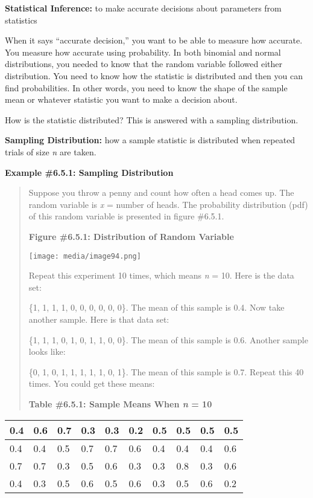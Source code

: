 \documentclass[]{book}
\begin{document}
\textbf{Statistical Inference:} to make accurate decisions about parameters from statistics

When it says ``accurate decision,'' you want to be able to measure how accurate. You measure how accurate using probability. In both binomial and normal distributions, you needed to know that the random variable followed either distribution. You need to know how the statistic is distributed and then you can find probabilities. In other words, you need to know the shape of the sample mean or whatever statistic you want to make a decision about.

How is the statistic distributed? This is answered with a sampling distribution.

\textbf{Sampling Distribution:} how a sample statistic is distributed when repeated trials of size \emph{n} are taken.

\textbf{Example \#6.5.1: Sampling Distribution}

\begin{quote}
Suppose you throw a penny and count how often a head comes up. The random variable is \emph{x} = number of heads. The probability distribution (pdf) of this random variable is presented in figure \#6.5.1.

\textbf{Figure \#6.5.1: Distribution of Random Variable}

\texttt{[image: media/image94.png]}

Repeat this experiment 10 times, which means \emph{n} = 10. Here is the data set:

\{1, 1, 1, 1, 0, 0, 0, 0, 0, 0\}. The mean of this sample is 0.4. Now take another sample. Here is that data set:

\{1, 1, 1, 0, 1, 0, 1, 1, 0, 0\}. The mean of this sample is 0.6.
Another sample looks like:

\{0, 1, 0, 1, 1, 1, 1, 1, 0, 1\}. The mean of this sample is 0.7. Repeat this 40 times. You could get these means:

\textbf{Table \#6.5.1: Sample Means When \emph{n} = 10}
\end{quote}

\begin{longtable}[]{@{}llllllllll@{}}
\toprule
0.4 & 0.6 & 0.7 & 0.3 & 0.3 & 0.2 & 0.5 & 0.5 & 0.5 & 0.5\tabularnewline
\midrule
\endhead
0.4 & 0.4 & 0.5 & 0.7 & 0.7 & 0.6 & 0.4 & 0.4 & 0.4 & 0.6\tabularnewline
0.7 & 0.7 & 0.3 & 0.5 & 0.6 & 0.3 & 0.3 & 0.8 & 0.3 & 0.6\tabularnewline
0.4 & 0.3 & 0.5 & 0.6 & 0.5 & 0.6 & 0.3 & 0.5 & 0.6 & 0.2\tabularnewline
\bottomrule
\end{longtable}
\end{document}
